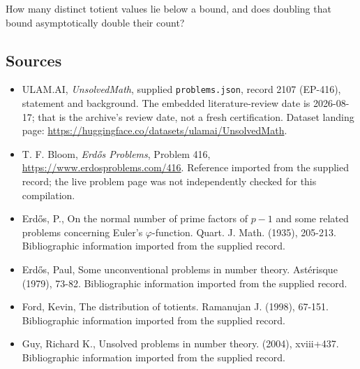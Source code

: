 \documentclass[11pt,a4paper]{article}
\begin{document}
How many distinct totient values lie below a bound, and does doubling that bound asymptotically double their count?

\subsection{Sources}

{\small

\begin{itemize}

\item[\hypertarget{source:2107:1}{S1}] ULAM.AI, \emph{UnsolvedMath}, supplied \texttt{problems.json}, record 2107 (EP-416), statement and background. The embedded literature-review date is 2026-08-17; that is the archive’s review date, not a fresh certification. Dataset landing page: \url{https://huggingface.co/datasets/ulamai/UnsolvedMath}.

\item[\hypertarget{source:2107:2}{S2}] T. F. Bloom, \emph{Erdős Problems}, Problem 416, \url{https://www.erdosproblems.com/416}. Reference imported from the supplied record; the live problem page was not independently checked for this compilation.

\item[\hypertarget{source:2107:3}{S3}] Erd\H{o}s, P., On the normal number of prime factors of $p-1$ and some related problems concerning Euler's $\varphi$-function. Quart. J. Math. (1935), 205-213. Bibliographic information imported from the supplied record.

\item[\hypertarget{source:2107:4}{S4}] Erd\H{o}s, Paul, Some unconventional problems in number theory. Ast\'{e}risque (1979), 73-82. Bibliographic information imported from the supplied record.

\item[\hypertarget{source:2107:5}{S5}] Ford, Kevin, The distribution of totients. Ramanujan J. (1998), 67-151. Bibliographic information imported from the supplied record.

\item[\hypertarget{source:2107:6}{S6}] Guy, Richard K., Unsolved problems in number theory. (2004), xviii+437. Bibliographic information imported from the supplied record.

\end{itemize}

}

\label{end:2107}
\end{document}
